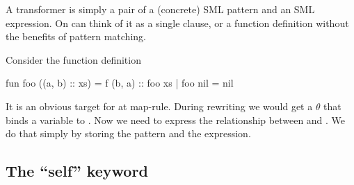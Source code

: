 A transformer is simply a pair of a (concrete) SML pattern and an SML
expression. On can think of it as a single clause, or a function definition
without the benefits of pattern matching.

Consider the function definition
\begin{sml}
fun foo ((a, b) :: xs) = f (b, a) :: foo xs
  | foo nil            = nil
\end{sml}
It is an obvious target for at \textsf{map}-rule. During rewriting we would get
a $\theta$ that binds a variable to . Now we need to express
the relationship between  and . We do that
simply by storing the pattern and the expression.

\subsection{The ``\textsf{self}'' keyword}


